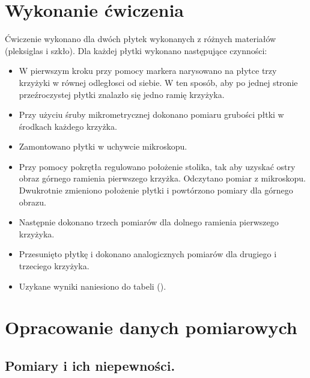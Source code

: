 \documentclass [a4paper,11pt]{article}
\begin{document}
	\section{Wykonanie ćwiczenia}
	Ćwiczenie wykonano dla dwóch płytek wykonanych z różnych materiałów (pleksiglas i szkło).
	Dla każdej płytki wykonano następujące czynności:
	\begin{itemize}
		\item W pierwszym kroku przy pomocy markera narysowano na płytce trzy krzyżyki w równej odległosci od siebie.
		W ten sposób, aby po jednej stronie przeźroczystej płytki znalazło się jedno ramię krzyżyka.
		\item 
			Przy użyciu śruby mikrometrycznej dokonano pomiaru grubości płtki w 
			środkach każdego krzyżka.
		\item Zamontowano płytki w uchywcie mikroskopu. 
		\item Przy pomocy pokrętła regulowano położenie stolika, tak aby uzyskać ostry obraz 
		górnego ramienia pierwszego krzyżka.  Odczytano pomiar z mikroskopu. Dwukrotnie zmieniono położenie płytki i powtórzono pomiary dla górnego obrazu.
		\item Następnie dokonano trzech pomiarów dla dolnego ramienia pierwszego krzyżyka.
		\item Przesunięto płytkę i dokonano analogicznych pomiarów dla drugiego i trzeciego krzyżyka.
		\item Uzykane wyniki naniesiono do tabeli ().  
	\end{itemize}
	

	\section{Opracowanie danych pomiarowych}\label{sec:opr}
	\subsection{Pomiary i ich niepewności.}
		
	
 
	
\end{document}
